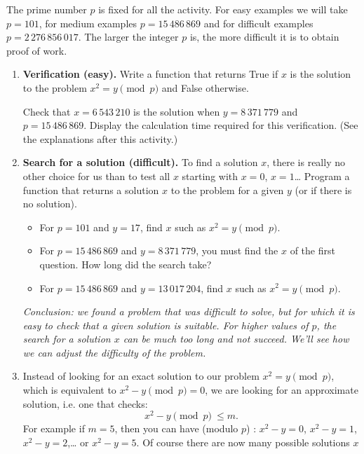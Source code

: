 \documentclass[11pt,class=report,crop=false]{standalone}
\begin{document}
\begin{activite}
The prime number $p$ is fixed for all the activity. 
For easy examples we will take $p = 101$, for medium examples $p = 15\,486\,869$ and for difficult examples $p = 2\,276\,856\,017$. The larger the integer $p$ is, the more difficult it is to obtain proof of work.

\begin{enumerate}
  \item \textbf{Verification (easy).} 
  Write a function  that returns \og{}True\fg{} if $x$ is the solution to the problem $x^2 = y \pmod{p}$ and \og{}False\fg{} otherwise.
  
  Check that $x = 6\,543\,210$ is the solution when $y = 8\,371\,779$ and $p = 15\,486\,869$. Display the calculation time required for this verification. (See the explanations after this activity.)
  
  \item \textbf{Search for a solution (difficult).} To find a solution $x$, there is really no other choice for us than to test all $x$ starting with $x=0$, $x=1$\ldots{}
Program a  function that returns a solution $x$ to the problem for a given $y$ (or  if there is no solution).

  \begin{itemize}
    \item For $p = 101$ and $y=17$, find $x$ such as $x^2 = y \pmod{p}$. 
    \item For $p = 15\,486\,869$ and $y = 8\,371\,779$, you must find the $x$ of the first question. How long did the search take? 
    
    \item For $p = 15\,486\,869$ and $y = 13\,017\,204$, find $x$ such as $x^2 = y \pmod{p}$.    
   \end{itemize}


\medskip

\emph{Conclusion: we found a problem that was difficult to solve, but for which it is easy to check that a given solution is suitable. For higher values of $p$, the search for a solution $x$ can be much too long and not succeed. We'll see how we can adjust the difficulty of the problem.}


	\item Instead of looking for an exact solution to our problem $x^2 = y \pmod{p}$, which is equivalent to $x^2-y \pmod{p} = 0$, we are looking for an approximate solution, i.e. one that checks: $$x^2 - y \pmod{p} \ \le m.$$
	For example if $m=5$, then you can have (modulo $p$) : $x^2 - y = 0$, $x^2 - y = 1$,
	$x^2-y = 2$,\ldots{} or $x^2-y=5$. 
	Of course there are now many possible solutions $x$
	

\end{enumerate}
\end{activite}
\end{document}
